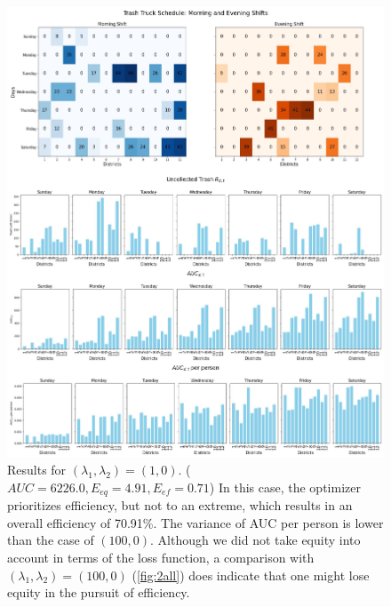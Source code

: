 \documentclass{article}
\begin{document}
\begin{figure}[H]
	\centering
	\includegraphics[width=1\textwidth]{figures/(1,0).jpg}
	\caption{Results for $(\lambda_1, \lambda_2) = (1,0)$. ($AUC = 6226.0, E_{eq} = 4.91, E_{ef} = 0.71$) In this case, the optimizer prioritizes efficiency, but not to an extreme, which results in an overall efficiency of 70.91\%. The variance of AUC per person is lower than the case of $(100,0)$. Although we did not take equity into account in terms of the loss function, a comparison with $(\lambda_1, \lambda_2) = (100,0)$ (\cref{fig:2all}) does indicate that one might lose equity in the pursuit of efficiency. }
	\label{fig:3all}
\end{figure}
\end{document}

